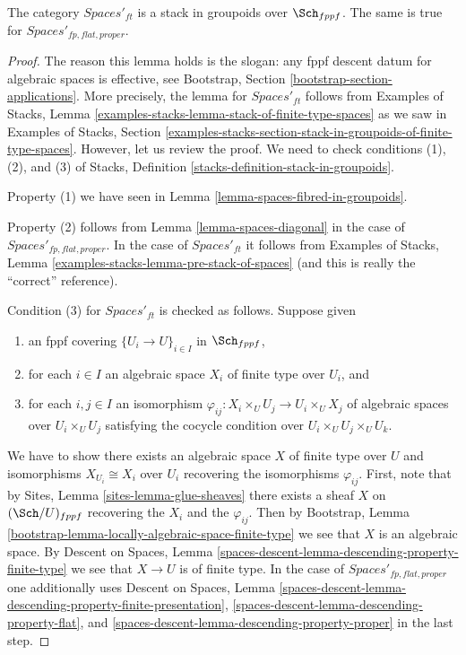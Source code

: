 \begin{lemma}
\label{lemma-spaces-stack}
The category $\textit{Spaces}'_{ft}$ is a stack in groupoids
over $\Sch_{fppf}$. The same is true for
$\textit{Spaces}'_{fp, flat, proper}$.
\end{lemma}

\begin{proof}
The reason this lemma holds is the slogan: any fppf descent datum for algebraic
spaces is effective, see Bootstrap, Section
\ref{bootstrap-section-applications}.
More precisely, the lemma for $\textit{Spaces}'_{ft}$ follows from
Examples of Stacks, Lemma
\ref{examples-stacks-lemma-stack-of-finite-type-spaces}
as we saw in Examples of Stacks, Section
\ref{examples-stacks-section-stack-in-groupoids-of-finite-type-spaces}.
However, let us review the proof. We need to check conditions
(1), (2), and (3) of Stacks, Definition
\ref{stacks-definition-stack-in-groupoids}.

\medskip\noindent
Property (1) we have seen in Lemma \ref{lemma-spaces-fibred-in-groupoids}.

\medskip\noindent
Property (2) follows from
Lemma \ref{lemma-spaces-diagonal} in the case of
$\textit{Spaces}'_{fp, flat, proper}$.
In the case of $\textit{Spaces}'_{ft}$ it follows
from Examples of Stacks, Lemma
\ref{examples-stacks-lemma-pre-stack-of-spaces}
(and this is really the ``correct'' reference).

\medskip\noindent
Condition (3) for $\textit{Spaces}'_{ft}$ is checked as follows. Suppose given
\begin{enumerate}
\item an fppf covering $\{U_i \to U\}_{i \in I}$ in $\Sch_{fppf}$,
\item for each $i \in I$ an algebraic space $X_i$ of finite type over
$U_i$, and
\item for each $i, j \in I$ an isomorphism
$\varphi_{ij} : X_i \times_U U_j \to U_i \times_U X_j$ of algebraic spaces
over $U_i \times_U U_j$ satisfying the cocycle condition over
$U_i \times_U U_j \times_U U_k$.
\end{enumerate}
We have to show there exists an algebraic space $X$ of finite type over $U$
and isomorphisms $X_{U_i} \cong X_i$ over $U_i$ recovering the
isomorphisms $\varphi_{ij}$.
First, note that by Sites, Lemma \ref{sites-lemma-glue-sheaves}
there exists a sheaf $X$ on $(\Sch/U)_{fppf}$ recovering
the $X_i$ and the $\varphi_{ij}$. Then by
Bootstrap, Lemma \ref{bootstrap-lemma-locally-algebraic-space-finite-type}
we see that $X$ is an algebraic space.
By Descent on Spaces, Lemma
\ref{spaces-descent-lemma-descending-property-finite-type}
we see that $X \to U$ is of finite type.
In the case of $\textit{Spaces}'_{fp, flat, proper}$
one additionally uses
Descent on Spaces, Lemma
\ref{spaces-descent-lemma-descending-property-finite-presentation},
\ref{spaces-descent-lemma-descending-property-flat}, and
\ref{spaces-descent-lemma-descending-property-proper}
in the last step.
\end{proof}

